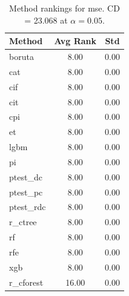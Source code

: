 \begin{table}[h]
\centering
\caption{Method rankings for mse. CD = 23.068 at $\alpha=0.05$.}
\label{tab:ranks_mse}
\begin{tabular}{lcc}
\toprule
Method & Avg Rank & Std \\
\midrule
boruta & 8.00 & 0.00 \\
cat & 8.00 & 0.00 \\
cif & 8.00 & 0.00 \\
cit & 8.00 & 0.00 \\
cpi & 8.00 & 0.00 \\
et & 8.00 & 0.00 \\
lgbm & 8.00 & 0.00 \\
pi & 8.00 & 0.00 \\
ptest_dc & 8.00 & 0.00 \\
ptest_pc & 8.00 & 0.00 \\
ptest_rdc & 8.00 & 0.00 \\
r_ctree & 8.00 & 0.00 \\
rf & 8.00 & 0.00 \\
rfe & 8.00 & 0.00 \\
xgb & 8.00 & 0.00 \\
r_cforest & 16.00 & 0.00 \\
\bottomrule
\end{tabular}
\end{table}